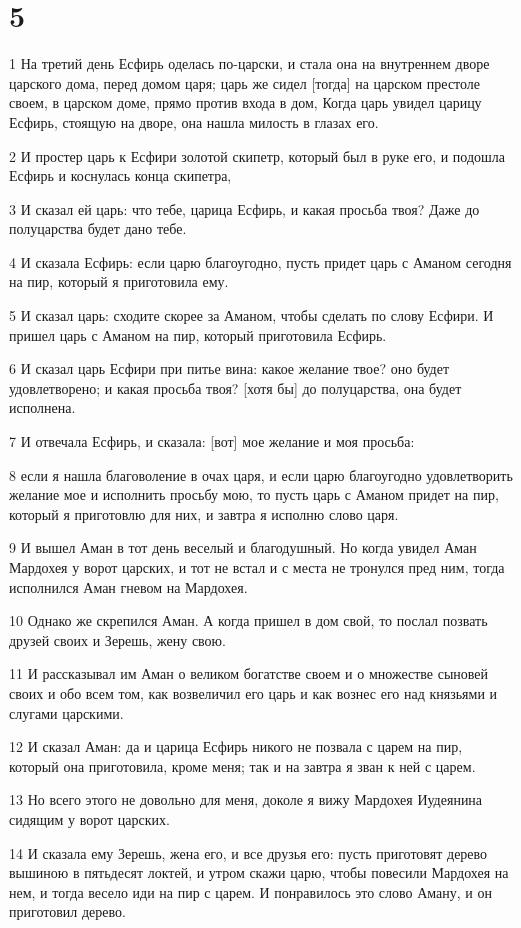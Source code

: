 \chapter{5}

\par 1 На третий день Есфирь оделась по-царски, и стала она на внутреннем дворе царского дома, перед домом царя; царь же сидел [тогда] на царском престоле своем, в царском доме, прямо против входа в дом, Когда царь увидел царицу Есфирь, стоящую на дворе, она нашла милость в глазах его.
\par 2 И простер царь к Есфири золотой скипетр, который был в руке его, и подошла Есфирь и коснулась конца скипетра,
\par 3 И сказал ей царь: что тебе, царица Есфирь, и какая просьба твоя? Даже до полуцарства будет дано тебе.
\par 4 И сказала Есфирь: если царю благоугодно, пусть придет царь с Аманом сегодня на пир, который я приготовила ему.
\par 5 И сказал царь: сходите скорее за Аманом, чтобы сделать по слову Есфири. И пришел царь с Аманом на пир, который приготовила Есфирь.
\par 6 И сказал царь Есфири при питье вина: какое желание твое? оно будет удовлетворено; и какая просьба твоя? [хотя бы] до полуцарства, она будет исполнена.
\par 7 И отвечала Есфирь, и сказала: [вот] мое желание и моя просьба:
\par 8 если я нашла благоволение в очах царя, и если царю благоугодно удовлетворить желание мое и исполнить просьбу мою, то пусть царь с Аманом придет на пир, который я приготовлю для них, и завтра я исполню слово царя.
\par 9 И вышел Аман в тот день веселый и благодушный. Но когда увидел Аман Мардохея у ворот царских, и тот не встал и с места не тронулся пред ним, тогда исполнился Аман гневом на Мардохея.
\par 10 Однако же скрепился Аман. А когда пришел в дом свой, то послал позвать друзей своих и Зерешь, жену свою.
\par 11 И рассказывал им Аман о великом богатстве своем и о множестве сыновей своих и обо всем том, как возвеличил его царь и как вознес его над князьями и слугами царскими.
\par 12 И сказал Аман: да и царица Есфирь никого не позвала с царем на пир, который она приготовила, кроме меня; так и на завтра я зван к ней с царем.
\par 13 Но всего этого не довольно для меня, доколе я вижу Мардохея Иудеянина сидящим у ворот царских.
\par 14 И сказала ему Зерешь, жена его, и все друзья его: пусть приготовят дерево вышиною в пятьдесят локтей, и утром скажи царю, чтобы повесили Мардохея на нем, и тогда весело иди на пир с царем. И понравилось это слово Аману, и он приготовил дерево.

